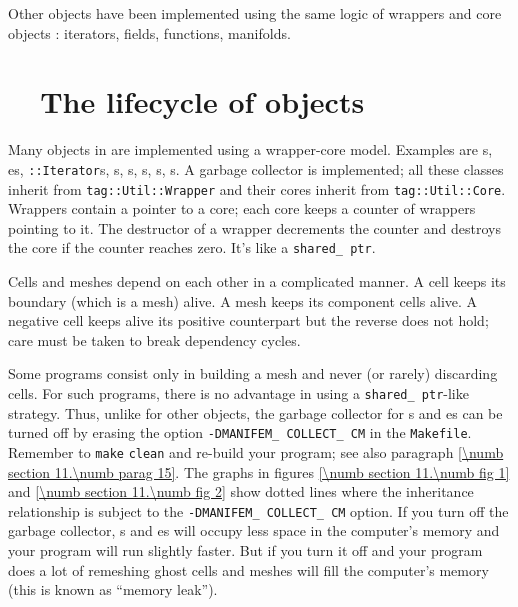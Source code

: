 Other objects have been implemented using the same logic of wrappers and core objects :
iterators, fields, functions, manifolds.


\section{~~The lifecycle of objects}\label{\numb section 11.\numb parag 5}

Many objects in {\maniFEM} are implemented using a wrapper-core model.
Examples are {\small\tt{}}s, {\small\tt{}}es,
{\small\tt{}::Iterator}s, {\small\tt{}}s,
{\small\tt{}}s, {\small\tt{}}s, {\small\tt{}}s,%
s.
A garbage collector is implemented; all these classes inherit from
{\small\tt \textcolor{tag}{tag}::Util::Wrapper} and
their cores inherit from {\small\tt \textcolor{tag}{tag}::Util::Core}.
Wrappers contain a pointer to a core; each core keeps a counter of wrappers pointing to it.
The destructor of a wrapper decrements the counter and destroys the core if the counter
reaches zero.
It's like a {\small\tt shared\_\,ptr}.

Cells and meshes depend on each other in a complicated manner.
A cell keeps its boundary (which is a mesh) alive.
A mesh keeps its component cells alive.
A negative cell keeps alive its positive counterpart but the reverse does not hold;
care must be taken to break dependency cycles.

Some programs consist only in building a mesh and never (or rarely) discarding cells.
For such programs, there is no advantage in using a {\small\tt shared\_\,ptr}-like strategy.
Thus, unlike for other {\maniFEM} objects, the garbage collector for {\small\tt{}}s and
{\small\tt{}}es can be turned off by erasing the option
{\small\tt -DMANIFEM\_\,COLLECT\_\,CM} in the {\small\tt Makefile}.
Remember to {\small\tt make} {\small\tt clean} and re-build your program;
see also paragraph \ref{\numb section 11.\numb parag 15}.
The graphs in figures \ref{\numb section 11.\numb fig 1} and \ref{\numb section 11.\numb fig 2}
show dotted lines where the inheritance relationship is subject to the
{\small\tt -DMANIFEM\_\,COLLECT\_\,CM} option.
If you turn off the garbage collector, {\small\tt{}}s and {\small\tt{}}es
will occupy less space in the computer's memory and your program will run slightly faster.
But if you turn it off and your program does a lot of remeshing
ghost cells and meshes will fill the computer's memory (this is known as ``memory leak'').

